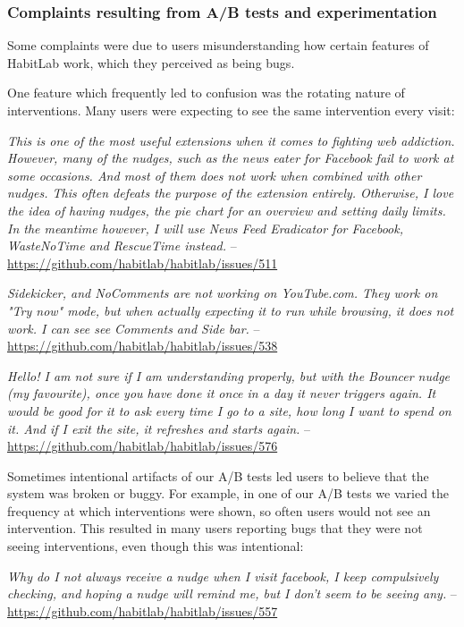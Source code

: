 \subsubsection{Complaints resulting from A/B tests and experimentation}

Some complaints were due to users misunderstanding how certain features of HabitLab work, which they perceived as being bugs.

One feature which frequently led to confusion was the rotating nature of interventions. Many users were expecting to see the same intervention every visit:

\textit{This is one of the most useful extensions when it comes to fighting web addiction. However, many of the nudges, such as the news eater for Facebook fail to work at some occasions. And most of them does not work when combined with other nudges. This often defeats the purpose of the extension entirely. Otherwise, I love the idea of having nudges, the pie chart for an overview and setting daily limits. In the meantime however, I will use News Feed Eradicator for Facebook, WasteNoTime and RescueTime instead.} -- \url{https://github.com/habitlab/habitlab/issues/511}

\textit{Sidekicker, and NoComments are not working on YouTube.com. They work on "Try now" mode, but when actually expecting it to run while browsing, it does not work. I can see see Comments and Side bar.} -- \url{https://github.com/habitlab/habitlab/issues/538}

\textit{Hello! I am not sure if I am understanding properly, but with the Bouncer nudge (my favourite), once you have done it once in a day it never triggers again. It would be good for it to ask every time I go to a site, how long I want to spend on it. And if I exit the site, it refreshes and starts again.} -- \url{https://github.com/habitlab/habitlab/issues/576}

Sometimes intentional artifacts of our A/B tests led users to believe that the system was broken or buggy. For example, in one of our A/B tests we varied the frequency at which interventions were shown, so often users would not see an intervention. This resulted in many users reporting bugs that they were not seeing interventions, even though this was intentional:

\textit{Why do I not always receive a nudge when I visit facebook, I keep compulsively checking, and hoping a nudge will remind me, but I don't seem to be seeing any.} -- \url{https://github.com/habitlab/habitlab/issues/557}

